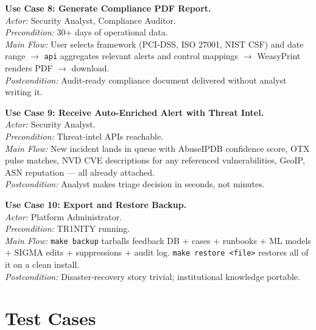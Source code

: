 \documentclass[11pt,a4paper]{article}
\begin{document}
\textbf{Use Case 8: Generate Compliance PDF Report.} \\
\textit{Actor:} Security Analyst, Compliance Auditor. \\
\textit{Precondition:} 30+ days of operational data. \\
\textit{Main Flow:} User selects framework (PCI-DSS, ISO 27001, NIST CSF) and date range $\rightarrow$ \texttt{api} aggregates relevant alerts and control mappings $\rightarrow$ WeasyPrint renders PDF $\rightarrow$ download. \\
\textit{Postcondition:} Audit-ready compliance document delivered without analyst writing it.

\textbf{Use Case 9: Receive Auto-Enriched Alert with Threat Intel.} \\
\textit{Actor:} Security Analyst. \\
\textit{Precondition:} Threat-intel APIs reachable. \\
\textit{Main Flow:} New incident lands in queue with AbuseIPDB confidence score, OTX pulse matches, NVD CVE descriptions for any referenced vulnerabilities, GeoIP, ASN reputation — all already attached. \\
\textit{Postcondition:} Analyst makes triage decision in seconds, not minutes.

\textbf{Use Case 10: Export and Restore Backup.} \\
\textit{Actor:} Platform Administrator. \\
\textit{Precondition:} TR1NITY running. \\
\textit{Main Flow:} \texttt{make backup} tarballs feedback DB + cases + runbooks + ML models + SIGMA edits + suppressions + audit log. \texttt{make restore <file>} restores all of it on a clean install. \\
\textit{Postcondition:} Disaster-recovery story trivial; institutional knowledge portable.

\newpage
\section{Test Cases}
\label{sec:tests}
\end{document}

